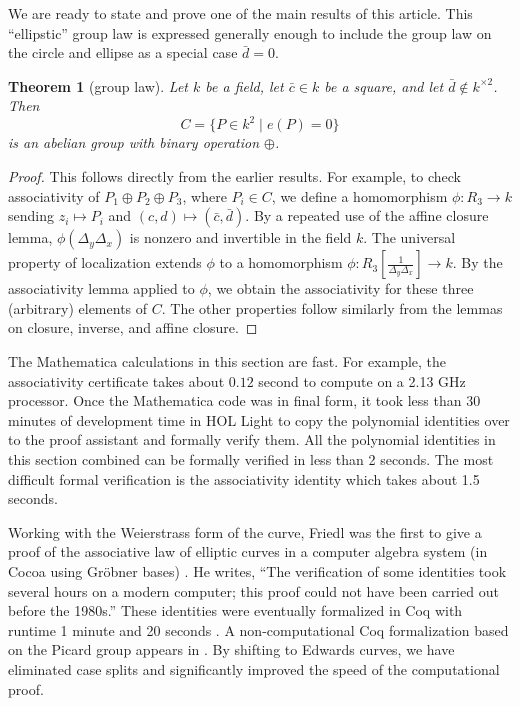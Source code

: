 \documentclass[12pt]{article}
\newtheorem{theorem}{Theorem}[subsection]
\newcommand{\f}[1]{\frac{1}{#1}}
\begin{document}
We are ready to state and prove one of the main results of this
article.  This ``ellipstic'' group law is expressed generally enough
to include the group law on the circle and ellipse as a special case
$\bar d = 0$.

\begin{theorem}[group law]\label{thm:group} 
  Let $k$ be a field, let $\bar c \in k$ be a square, and let $\bar
  d\not\in k^{\times 2}$.  
  Then 
  \[
  C= \{P\in k^2 \mid  e(P) = 0\}
  \]
   is an abelian
  group with binary operation $\oplus$.
\end{theorem}

\begin{proof} This follows directly from the earlier results.  For
  example, to check associativity of $P_1\oplus P_2\oplus P_3$, where
  $P_i\in C$, we define a homomorphism $\phi:R_3\to k$ sending
  $z_i\mapsto P_i$ and $(c,d)\mapsto (\bar c,\bar d)$.  By a repeated
  use of the affine closure lemma, $\phi(\Delta_y\Delta_x)$ is nonzero
  and invertible in the field $k$.  The universal property of
  localization extends $\phi$ to a homomorphism
  $\phi:R_3[\f{\Delta_y\Delta_x}]\to k$.  By the associativity lemma
  applied to $\phi$, we obtain the associativity for these three
  (arbitrary) elements of $C$.  The other properties follow similarly
  from the lemmas on closure, inverse, and affine closure.
\end{proof}

The Mathematica calculations in this section are fast. For example,
the associativity certificate takes about $0.12$ second to compute on
a 2.13 GHz processor.  Once the Mathematica code was in final form, it
took less than 30 minutes of development time in HOL Light to copy the
polynomial identities over to the proof assistant and formally verify
them.  All the polynomial identities in this section combined can be
formally verified in less than 2 seconds. The most difficult formal
verification is the associativity identity which takes about 1.5
seconds.

Working with the Weierstrass form of the curve, Friedl was the first
to give a proof of the associative law of elliptic curves in a
computer algebra system (in Cocoa using Gr\"obner bases)
\cite{friedl}.  He writes, ``The verification of some identities took
several hours on a modern computer; this proof could not have been
carried out before the 1980s.''  These identities were eventually
formalized in Coq with runtime 1 minute and 20 seconds
\cite{thery2007proving}.  A non-computational Coq
formalization based on the Picard group appears in
\cite{bartzia2014formal}.  By shifting to Edwards curves, we have
eliminated case splits and
significantly improved the speed of the computational proof.
\end{document}
